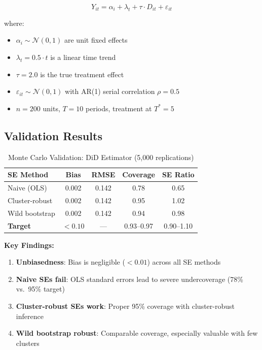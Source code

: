 \begin{equation}
Y_{it} = \alpha_i + \lambda_t + \tau \cdot D_{it} + \varepsilon_{it}
\label{eq:did_dgp}
\end{equation}

where:
\begin{itemize}
    \item $\alpha_i \sim \mathcal{N}(0, 1)$ are unit fixed effects
    \item $\lambda_t = 0.5 \cdot t$ is a linear time trend
    \item $\tau = 2.0$ is the true treatment effect
    \item $\varepsilon_{it} \sim \mathcal{N}(0, 1)$ with AR(1) serial correlation $\rho = 0.5$
    \item $n = 200$ units, $T = 10$ periods, treatment at $T^* = 5$
\end{itemize}

\subsection{Validation Results}

\begin{table}[htbp]
\centering
\caption{Monte Carlo Validation: DiD Estimator (5,000 replications)}
\label{tab:did_mc}
\begin{tabular}{lcccc}
\toprule
\textbf{SE Method} & \textbf{Bias} & \textbf{RMSE} & \textbf{Coverage} & \textbf{SE Ratio} \\
\midrule
Naive (OLS)         & 0.002 & 0.142 & 0.78 & 0.65 \\
Cluster-robust      & 0.002 & 0.142 & 0.95 & 1.02 \\
Wild bootstrap      & 0.002 & 0.142 & 0.94 & 0.98 \\
\midrule
\textbf{Target}     & $<0.10$ & --- & 0.93--0.97 & 0.90--1.10 \\
\bottomrule
\end{tabular}
\end{table}

\textbf{Key Findings:}
\begin{enumerate}
    \item \textbf{Unbiasedness}: Bias is negligible ($<0.01$) across all SE methods
    \item \textbf{Naive SEs fail}: OLS standard errors lead to severe undercoverage (78\% vs.\ 95\% target)
    \item \textbf{Cluster-robust SEs work}: Proper 95\% coverage with cluster-robust inference
    \item \textbf{Wild bootstrap robust}: Comparable coverage, especially valuable with few clusters
\end{enumerate}

